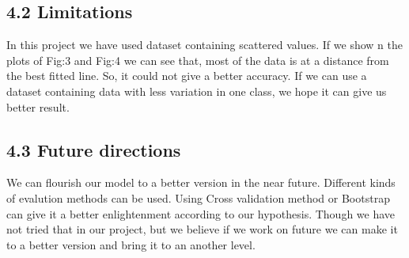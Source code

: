 \documentclass[conference]{IEEEtran}[10]
\begin{document}
\subsection{4.2 Limitations}
In this project we have used dataset containing scattered values. If we show n the plots of Fig:3 and Fig:4 we can see that, most of the data is at a distance from the best fitted line. So, it could not give a better accuracy. If we can use a dataset containing data with less variation in one class, we hope it can give us better result.
\\
\subsection{4.3 Future directions}
We can flourish our model to a better version in the near future. Different kinds of evalution methods can be used. Using Cross validation method or Bootstrap can give it a better enlightenment according to our hypothesis. Though we have not tried that in our project, but we believe if we work on future we can make it to a better version and bring it to an another level.


\end{document}
